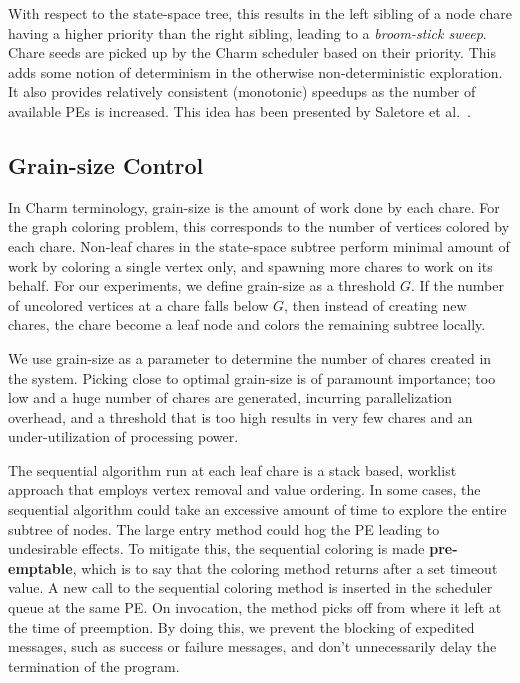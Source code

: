 \documentclass[10pt,oneside]{article}
\begin{document}
            With respect to the state-space tree, this results in the left sibling of a node chare having a higher
            priority than the right sibling, leading to a \emph{broom-stick sweep}. Chare seeds are picked up 
            by the Charm scheduler based on their priority. This adds some notion of determinism 
            in the otherwise non-deterministic exploration. It also provides relatively consistent (monotonic) 
            speedups as the number of available PEs is increased. This idea has been presented by Saletore et al.~\cite{SearchAAAI90}.
          
\subsection{Grain-size Control}   
\label{sec:grainsize}
  In Charm terminology, grain-size is the amount of work done by each chare. For the graph 
  coloring problem, this corresponds to the number of vertices colored by each chare. Non-leaf chares 
  in the state-space subtree perform minimal amount of work by coloring a single vertex only, and spawning 
  more chares to work on its behalf. For our experiments, we define grain-size as a threshold $G$. If 
  the number of uncolored vertices at a chare falls below $G$, then instead of creating new chares, the 
  chare become a leaf node and colors the remaining subtree locally.
  
  We use grain-size as a parameter to determine the number of chares created in the system.
  Picking close to optimal grain-size is of paramount importance; too
  low and a huge number of chares are generated, incurring parallelization
  overhead, and a threshold that is too high results in very few chares and an
  under-utilization of processing power. 
  
  The sequential algorithm run at each leaf chare is a stack based, worklist
  approach that employs vertex removal and value ordering. In some cases, the 
  sequential algorithm could take an excessive amount of time to explore the entire subtree of nodes.
  The large entry method could hog the PE leading to undesirable effects. To mitigate this, the
  sequential coloring is made \textbf{pre-emptable}, which is to say that the coloring method
  returns after a set timeout value. A new call to the sequential coloring method is 
  inserted in the scheduler queue at the same PE. On invocation, the method picks 
  off from where it left at the time of preemption. By doing this, we prevent the 
  blocking of expedited messages, such as
  success or failure messages, and don't unnecessarily delay the termination of
  the program. 
  
\end{document}
